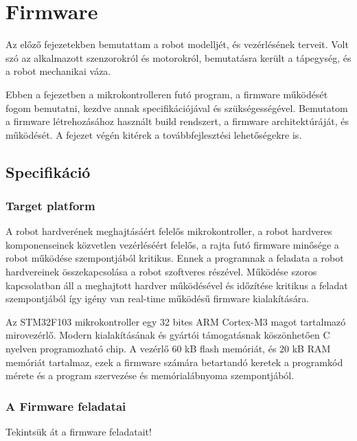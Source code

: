 \chapter{Firmware}


Az előző fejezetekben bemutattam a robot modelljét, és vezérlésének terveit. Volt
szó az alkalmazott szenzorokról és motorokról, bemutatásra került a tápegység, és
a robot mechanikai váza.

Ebben a fejezetben a mikrokontrolleren futó program, a firmware működését fogom
bemutatni, kezdve annak specifikációjával és szükségességével. Bemutatom a
firmware létrehozásához használt build rendszert, a firmware architektúráját, és
működését. A fejezet végén kitérek a továbbfejlesztési lehetőségekre is.

\section{Specifikáció}

\subsection{Target platform}

A robot hardverének meghajtásáért felelős mikrokontroller, a robot hardveres
komponenseinek közvetlen vezérléséért felelős, a rajta futó firmware minősége a
robot működése szempontjából kritikus. Ennek a programnak a feladata a robot
hardvereinek összekapcsolása a robot szoftveres részével. Működése szoros
kapcsolatban áll a meghajtott hardver működésével és időzítése kritikus a feladat
szempontjából így igény van real-time működésű firmware kialakítására.

Az STM32F103 mikrokontroller egy 32 bites ARM Cortex-M3 magot tartalmazó
mirovezérlő. Modern kialakításának és gyártói támogatásnak köszönhetően C nyelven
programozható chip. A vezérlő 60 kB flash memóriát, és 20 kB RAM memóriát
tartalmaz, ezek a firmware számára betartandó keretek a programkód mérete és a
program szervezése és memórialábnyoma szempontjából.

\subsection{A Firmware feladatai}

Tekintsük át a firmware feladatait!

